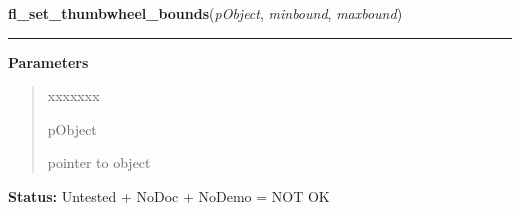 \hspace{.8\funcindent}\begin{boxedminipage}{\funcwidth}

    \raggedright \textbf{fl\_set\_thumbwheel\_bounds}(\textit{pObject}, \textit{minbound}, \textit{maxbound})

    \vspace{-1.5ex}

    \rule{\textwidth}{0.5\fboxrule}
\setlength{\parskip}{2ex}
\setlength{\parskip}{1ex}
      \textbf{Parameters}
      \vspace{-1ex}

      \begin{quote}
        \begin{Ventry}{xxxxxxx}

          \item[pObject]

          pointer to object

        \end{Ventry}

      \end{quote}

\textbf{Status:} Untested + NoDoc + NoDemo = NOT OK



    \end{boxedminipage}

    \label{xformslib:library:fl_get_thumbwheel_bounds}

    \vspace{0.5ex}

